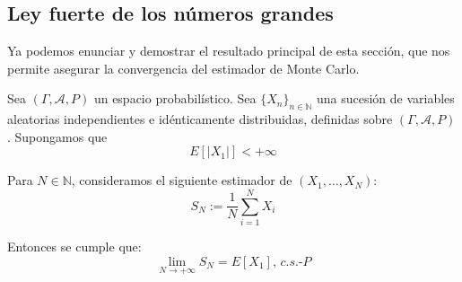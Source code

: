 \subsection{Ley fuerte de los números grandes}

Ya podemos enunciar y demostrar el resultado principal de esta sección, que nos permite asegurar la convergencia del estimador de Monte Carlo.

\begin{teorema}
Sea $(\Gamma, \mathcal{A}, P)$ un espacio probabilístico. Sea $\{X_n\}_{n\in \mathds{N}}$ una sucesión de variables aleatorias independientes e idénticamente distribuidas, definidas sobre $(\Gamma, \mathcal{A}, P)$. Supongamos que
$$E[|X_1|]<+\infty$$

Para $N\in \mathds{N}$, consideramos el siguiente estimador de $(X_1,\ldots ,X_N)$:
$$S_N:=\frac{1}{N}\sum_{i=1}^{N}X_i$$

Entonces se cumple que:
$$\lim_{N\to +\infty}S_N = E[X_1]\text{, } c.s.\text{-}P$$
\end{teorema}

